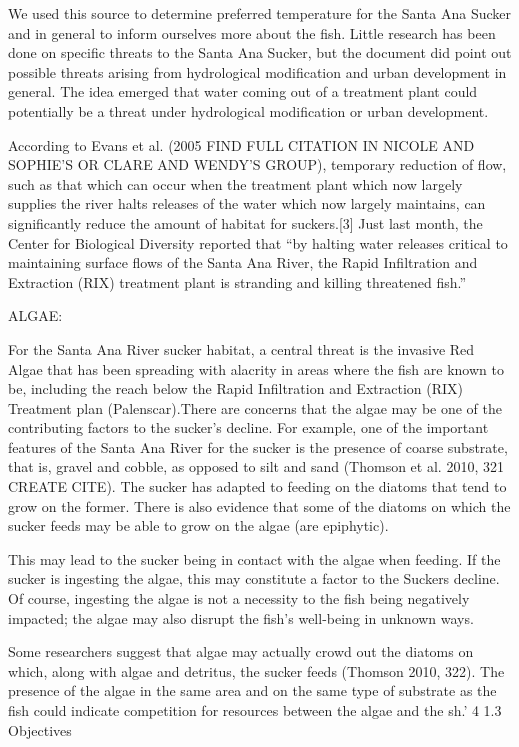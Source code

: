 \documentclass{article}\usepackage[]{graphicx}\usepackage[]{color}
\begin{document}
We used this source to determine preferred temperature for the Santa Ana Sucker and in general to inform ourselves more about the fish. Little research has been done on specific threats to the Santa Ana Sucker, but the document did point out possible threats arising from hydrological modification and urban development in general. The idea emerged that water coming out of a treatment plant could potentially be a threat under hydrological modification or urban development.


According to Evans et al. (2005 FIND FULL CITATION IN NICOLE AND SOPHIE'S OR CLARE AND WENDY'S GROUP), temporary reduction of flow, such as that which can occur when the treatment plant which now largely supplies the river halts releases of the water which now largely maintains, can significantly reduce the amount of habitat for suckers.[3] Just last month, the Center for Biological Diversity reported that “by halting water releases critical to maintaining surface flows of the Santa Ana River, the Rapid Infiltration and Extraction (RIX) treatment plant is stranding and killing threatened fish.” 

ALGAE: 

For the Santa Ana River sucker habitat, a central threat is the invasive Red Algae that has been spreading with alacrity in areas where the fish are known to be, including the reach below the Rapid Infiltration and Extraction (RIX) Treatment plan (Palenscar).There are concerns that the algae may be one of the contributing factors to the sucker's decline. For example, one of the important features of the Santa Ana River for the sucker is the presence of coarse substrate, that is, gravel and cobble, as opposed to silt and sand (Thomson et al. 2010, 321 CREATE CITE). The sucker has adapted to feeding on the diatoms that tend to grow on the former. There is also evidence that some of the diatoms on which the sucker feeds may be able to grow on the algae (are epiphytic). 

This may lead to the sucker being in contact with the algae when feeding. If the sucker is ingesting the algae, this may constitute a factor to the Suckers decline. Of course, ingesting the algae is not a necessity to the fish being negatively impacted; the algae may also disrupt the fish's well-being in unknown ways. 

Some researchers suggest that algae may actually crowd out the diatoms on which, along with algae and detritus, the sucker feeds (Thomson 2010, 322). The presence of the algae in the same area and on the same type of substrate as the fish could indicate competition for resources between the algae and the sh.' 4 1.3 Objectives
\end{document}
